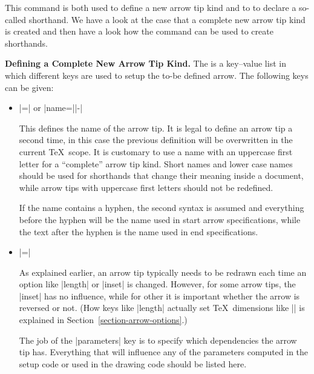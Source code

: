 \begin{command}{\pgfdeclarearrow{}}
    This command is both used to define a new arrow tip kind and to to declare
    a so-called shorthand. We have a look at the case that a complete new arrow
    tip kind is created and then have a look how the command can be used to
    create shorthands.


    \medskip
    \noindent\textbf{Defining a Complete New Arrow Tip Kind.}
    The  is a key--value list in which different keys are used to
    setup the to-be defined arrow. The following keys can be given:
    \begin{itemize}
        \item {}|=| or |name=||-|

            This defines the name of the arrow tip. It is legal to define an
            arrow tip a second time, in this case the previous definition will
            be overwritten in the current \TeX\ scope. It is customary to use a
            name with an uppercase first letter for a ``complete'' arrow tip
            kind. Short names and lower case names should be used for
            shorthands that change their meaning inside a document, while arrow
            tips with uppercase first letters should not be redefined.

            If the name contains a hyphen, the second syntax is assumed and
            everything before the hyphen will be the name used in start arrow
            specifications, while the text after the hyphen is the name used in
            end specifications.
        \item {}|=|

            As explained earlier, an arrow tip typically needs to be redrawn
            each time an option like |length| or |inset| is changed. However,
            for some arrow tips, the |inset| has no influence, while for other
            it is important whether the arrow is reversed or not. (How keys
            like |length| actually set \TeX\ dimensions like |\pgfarrowlength|
            is explained in Section~\ref{section-arrow-options}.)

            The job of the |parameters| key is to specify which dependencies
            the arrow tip has. Everything that will influence any of the
            parameters computed in the setup code or used in the drawing code
            should be listed here.


\end{itemize}
\end{command}
